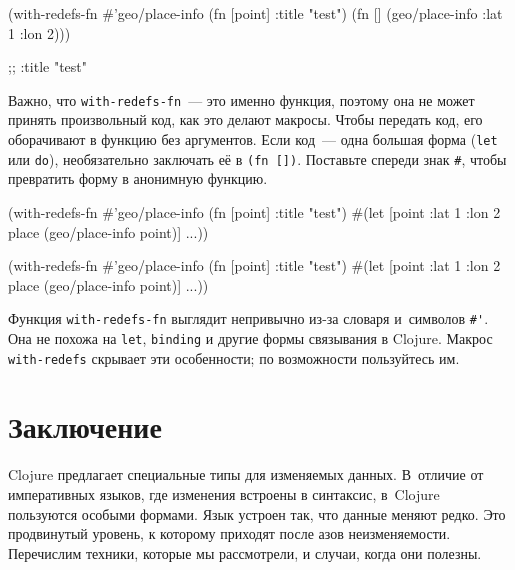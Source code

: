 \else

\begin{english}
  \begin{clojure}
(with-redefs-fn
  {#'geo/place-info (fn [point] {:title "test"})}
  (fn []
    (geo/place-info {:lat 1 :lon 2})))

;; {:title "test"}
  \end{clojure}
\end{english}

\fi


Важно, что \verb|with-redefs-fn|~--- это именно функция, поэтому она не может
принять произвольный код, как это делают макросы. Чтобы передать код, его
оборачивают в функцию без аргументов. Если код~--- одна большая форма
(\verb|let| или \verb|do|), необязательно заключать её в
\verb|(fn [])|. Поставьте спереди знак \verb|#|, чтобы превратить форму в
анонимную функцию.

\ifnarrow

\begin{english}
  \begin{clojure}
(with-redefs-fn
  {#'geo/place-info (fn [point]
                      {:title "test"})}
  #(let [point {:lat 1 :lon 2}
         place (geo/place-info point)]
     ...))
  \end{clojure}
\end{english}

\else

\begin{english}
  \begin{clojure}
(with-redefs-fn
  {#'geo/place-info (fn [point] {:title "test"})}
  #(let [point {:lat 1 :lon 2}
         place (geo/place-info point)]
     ...))
  \end{clojure}
\end{english}

\fi

Функция \verb|with-redefs-fn| выглядит непривычно из-за словаря и~символов
\verb|#'|. Она не похожа на \verb|let|, \verb|binding| и другие формы
связывания в Clojure. Макрос \verb|with-redefs| скрывает эти особенности; по
возможности пользуйтесь им.

\section{Заключение}

Clojure предлагает специальные типы для изменяемых данных. В~отличие от
императивных языков, где изменения встроены в синтаксис, в~Clojure пользуются
особыми формами. Язык устроен так, что данные меняют редко. Это продвинутый
уровень, к которому приходят после азов неизменяемости. Перечислим техники,
которые мы рассмотрели, и случаи, когда они полезны.


